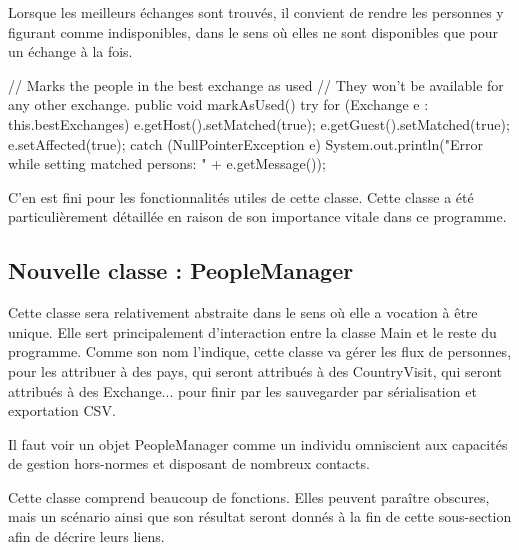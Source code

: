 \documentclass{mytex}
\begin{document}

Lorsque les meilleurs échanges sont trouvés, il convient de rendre les personnes y figurant comme indisponibles, dans le sens où elles ne sont disponibles que pour un échange à la fois.

\begin{codebox}
// Marks the people in the best exchange as used
// They won't be available for any other exchange.
public void markAsUsed() {
	try {
		for (Exchange e : this.bestExchanges) {
			e.getHost().setMatched(true);
			e.getGuest().setMatched(true);
			e.setAffected(true);
		}
	} catch (NullPointerException e) {
		System.out.println("Error while setting matched persons: " + e.getMessage());
	}
}
\end{codebox}

C'en est fini pour les fonctionnalités utiles de cette classe. Cette classe a été particulièrement détaillée en raison de son importance vitale dans ce programme.

\subsection{Nouvelle classe : PeopleManager}

Cette classe sera relativement abstraite dans le sens où elle a vocation à être unique. Elle sert principalement d'interaction entre la classe Main et le reste du programme. Comme son nom l'indique, cette classe va gérer les flux de personnes, pour les attribuer à des pays, qui seront attribués à des CountryVisit, qui seront attribués à des Exchange... pour finir par les sauvegarder par sérialisation et exportation CSV.

Il faut voir un objet PeopleManager comme un individu omniscient aux capacités de gestion hors-normes et disposant de nombreux contacts.

Cette classe comprend beaucoup de fonctions. Elles peuvent paraître obscures, mais un scénario ainsi que son résultat seront donnés à la fin de cette sous-section afin de décrire leurs liens.

\end{document}
